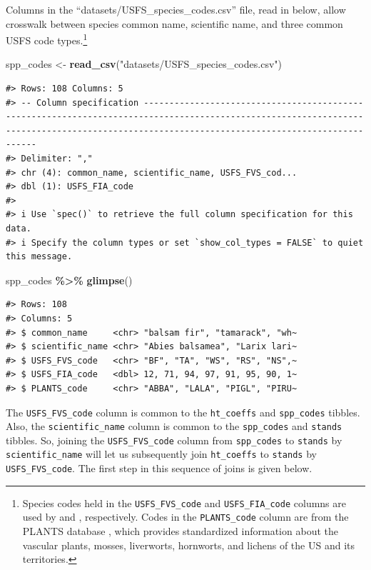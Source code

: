\documentclass[
  11pt,
]{krantz}
\newenvironment{Shaded}{\begin{snugshade}}{\end{snugshade}}
\newcommand{\KeywordTok}[1]{\textcolor[rgb]{0.13,0.29,0.53}{\textbf{#1}}}
\newcommand{\NormalTok}[1]{#1}
\newcommand{\OperatorTok}[1]{\textcolor[rgb]{0.81,0.36,0.00}{\textbf{#1}}}
\newcommand{\StringTok}[1]{\textcolor[rgb]{0.31,0.60,0.02}{#1}}
\theoremstyle{definition}
\theoremstyle{definition}
\theoremstyle{definition}
\theoremstyle{definition}
\theoremstyle{remark}
\begin{document}
Columns in the ``datasets/USFS\_species\_codes.csv'' file, read in below, allow crosswalk between species common name, scientific name, and three common USFS code types.\footnote{Species codes held in the \texttt{USFS\_FVS\_code} and \texttt{USFS\_FIA\_code} columns are used by \citet{FVSNE} and \citet{FIADB}, respectively. Codes in the \texttt{PLANTS\_code} column are from the PLANTS database \citep{PLANTSDB}, which provides standardized information about the vascular plants, mosses, liverworts, hornworts, and lichens of the US and its territories.}

\begin{Shaded}
\begin{Highlighting}[]
\NormalTok{spp\_codes \textless{}{-}}\StringTok{ }\KeywordTok{read\_csv}\NormalTok{(}\StringTok{"datasets/USFS\_species\_codes.csv"}\NormalTok{)}
\end{Highlighting}
\end{Shaded}

\begin{verbatim}
#> Rows: 108 Columns: 5
#> -- Column specification ---------------------------------------------------------------------------------------------------------------------------------------------------------------------------------------------
#> Delimiter: ","
#> chr (4): common_name, scientific_name, USFS_FVS_cod...
#> dbl (1): USFS_FIA_code
#> 
#> i Use `spec()` to retrieve the full column specification for this data.
#> i Specify the column types or set `show_col_types = FALSE` to quiet this message.
\end{verbatim}

\begin{Shaded}
\begin{Highlighting}[]
\NormalTok{spp\_codes }\OperatorTok{\%\textgreater{}\%}\StringTok{ }\KeywordTok{glimpse}\NormalTok{()}
\end{Highlighting}
\end{Shaded}

\begin{verbatim}
#> Rows: 108
#> Columns: 5
#> $ common_name     <chr> "balsam fir", "tamarack", "wh~
#> $ scientific_name <chr> "Abies balsamea", "Larix lari~
#> $ USFS_FVS_code   <chr> "BF", "TA", "WS", "RS", "NS",~
#> $ USFS_FIA_code   <dbl> 12, 71, 94, 97, 91, 95, 90, 1~
#> $ PLANTS_code     <chr> "ABBA", "LALA", "PIGL", "PIRU~
\end{verbatim}

The \texttt{USFS\_FVS\_code} column is common to the \texttt{ht\_coeffs} and \texttt{spp\_codes} tibbles. Also, the \texttt{scientific\_name} column is common to the \texttt{spp\_codes} and \texttt{stands} tibbles. So, joining the \texttt{USFS\_FVS\_code} column from \texttt{spp\_codes} to \texttt{stands} by \texttt{scientific\_name} will let us subsequently join \texttt{ht\_coeffs} to \texttt{stands} by \texttt{USFS\_FVS\_code}. The first step in this sequence of joins is given below.
\end{document}
